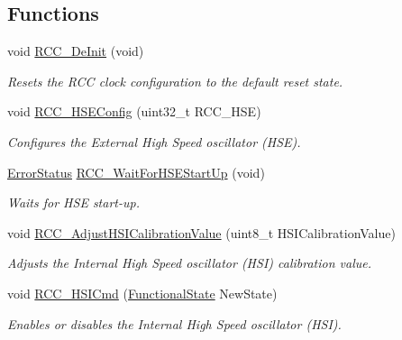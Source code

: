 \subsection*{Functions}
\begin{DoxyCompactItemize}
\item 
void \hyperlink{group___r_c_c___exported___functions_ga413f6422be11b1334abe60b3bff2e062}{R\+C\+C\+\_\+\+De\+Init} (void)
\begin{DoxyCompactList}\small\item\em Resets the R\+CC clock configuration to the default reset state. \end{DoxyCompactList}\item 
void \hyperlink{group___r_c_c___exported___functions_ga432b3281546d23345642d55f8670a93d}{R\+C\+C\+\_\+\+H\+S\+E\+Config} (uint32\+\_\+t R\+C\+C\+\_\+\+H\+SE)
\begin{DoxyCompactList}\small\item\em Configures the External High Speed oscillator (H\+SE). \end{DoxyCompactList}\item 
\hyperlink{group___exported__types_ga8333b96c67f83cba354b3407fcbb6ee8}{Error\+Status} \hyperlink{group___r_c_c___exported___functions_gae0f15692614dd048ee4110a056f001dc}{R\+C\+C\+\_\+\+Wait\+For\+H\+S\+E\+Start\+Up} (void)
\begin{DoxyCompactList}\small\item\em Waits for H\+SE start-\/up. \end{DoxyCompactList}\item 
void \hyperlink{group___r_c_c___exported___functions_gaa2d6a35f5c2e0f86317c3beb222677fc}{R\+C\+C\+\_\+\+Adjust\+H\+S\+I\+Calibration\+Value} (uint8\+\_\+t H\+S\+I\+Calibration\+Value)
\begin{DoxyCompactList}\small\item\em Adjusts the Internal High Speed oscillator (H\+SI) calibration value. \end{DoxyCompactList}\item 
void \hyperlink{group___r_c_c___exported___functions_ga0c6772a1e43765909495f57815ef69e2}{R\+C\+C\+\_\+\+H\+S\+I\+Cmd} (\hyperlink{group___exported__types_gac9a7e9a35d2513ec15c3b537aaa4fba1}{Functional\+State} New\+State)
\begin{DoxyCompactList}\small\item\em Enables or disables the Internal High Speed oscillator (H\+SI). \end{DoxyCompactList}\item 

\end{DoxyCompactItemize}
